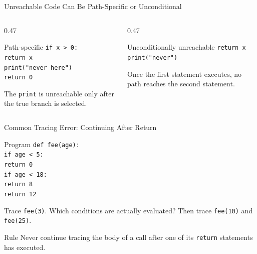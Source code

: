 \documentclass[aspectratio=169,10pt]{beamer}
\begin{document}
\begin{frame}{Unreachable Code Can Be Path-Specific or Unconditional}
  \begin{columns}[T,onlytextwidth]
    \begin{column}{0.47\textwidth}
      \begin{block}{Path-specific}
        \texttt{if x > 0:}\\
        \hspace*{0.20in}\texttt{return x}\\
        \hspace*{0.20in}\texttt{print("never here")}\\
        \texttt{return 0}
      \end{block}

      The \texttt{print} is unreachable only after the true branch is selected.
    \end{column}

    \begin{column}{0.47\textwidth}
      \begin{block}{Unconditionally unreachable}
        \texttt{return x}\\
        \texttt{print("never")}
      \end{block}

      Once the first statement executes, no path reaches the second statement.
    \end{column}
  \end{columns}
\end{frame}

\begin{frame}{Common Tracing Error: Continuing After Return}
  \begin{block}{Program}
    \texttt{def fee(age):}\\
    \hspace*{0.20in}\texttt{if age < 5:}\\
    \hspace*{0.40in}\texttt{return 0}\\
    \hspace*{0.20in}\texttt{if age < 18:}\\
    \hspace*{0.40in}\texttt{return 8}\\
    \hspace*{0.20in}\texttt{return 12}
  \end{block}

  \begin{activity}
    Trace \texttt{fee(3)}. Which conditions are actually evaluated? Then trace \texttt{fee(10)} and \texttt{fee(25)}.
  \end{activity}

  \begin{alertblock}{Rule}
    Never continue tracing the body of a call after one of its \texttt{return} statements has executed.
  \end{alertblock}
\end{frame}
\end{document}
